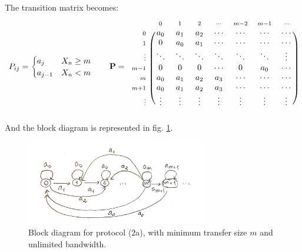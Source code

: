 \documentclass[../template.tex]{subfiles}
\begin{document}
The transition matrix becomes:
\begin{align*}
    P_{ij} = \begin{cases}
        a_j & X_n \geq m\\
        a_{j-1} & X_n < m
    \end{cases} \qquad \textbf{P} = \begin{blockarray}{*{7}{c} l}
        \begin{block}{l*{7}{>{\scriptstyle}c<{}}}
            & 0 & 1 & 2 & \cdots & m-2 & m-1 & \cdots \\
          \end{block}
          \begin{block}{>{\scriptstyle}r<{}(*{7}{c})}
            0 & a_0  & a_1  & a_2  & \cdots & \cdots & \cdots & \cdots \\ 
            1 & 0 & a_0 & a_1 & \cdots & \cdots & \cdots & \cdots \\ 
            \vdots & \ddots & \ddots & \ddots & \ddots & \ddots & \ddots & \vdots \\ 
            m-1 & 0 & 0 & 0 & \cdots & 0 & a_0 & \cdots \\ 
            m & a_0 & a_1 & a_2 & a_3 & \cdots & \cdots & \cdots \\ 
            m+1 & a_0 & a_1 & a_2 & a_3 & \cdots & \cdots & \cdots \\
            \vdots & \vdots & \vdots & \vdots & \vdots & \vdots & \vdots & \vdots \\
        \end{block} 
    \end{blockarray} 
\end{align*}
And the block diagram is represented in fig. \ref{fig:block2}.

\medskip

\begin{figure}[htp]
    \centering
    \includegraphics[width=0.7\textwidth]{block2.jpeg}
    \caption{Block diagram for protocol ($2$a), with minimum transfer size $m$ and unlimited bandwidth.\label{fig:block2}} 
\end{figure}
\end{document}
